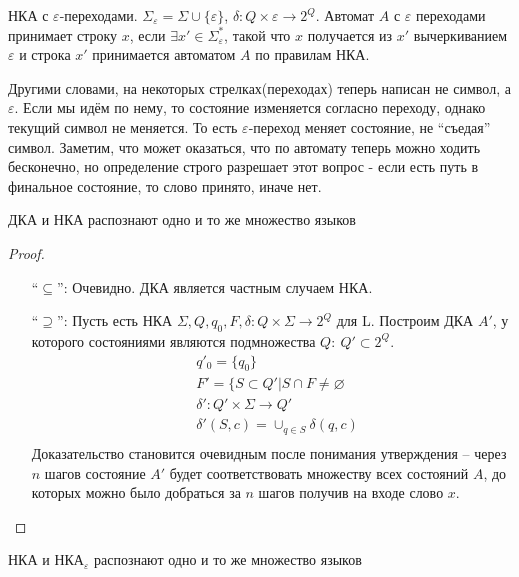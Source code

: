 \begin{conj}
    НКА с $\varepsilon$-переходами. $\Sigma_\varepsilon = \Sigma \cup \{\varepsilon\}$, $\delta : Q \times \varepsilon \to 2^Q$. 
    Автомат $A$ с $\varepsilon$ переходами принимает строку $x$, если $\exists x' \in \Sigma^*_\varepsilon$, такой что $x$ получается из $x'$ вычеркиванием $\varepsilon$ и 
    строка $x'$ принимается автоматом $A$ по правилам НКА.
\end{conj}

Другими словами, на некоторых стрелках(переходах) теперь написан не символ, а $\varepsilon$. Если мы идём по нему, то состояние изменяется согласно переходу, однако текущий символ не меняется. То есть $\varepsilon$-переход меняет состояние, не ``съедая'' символ. 
Заметим, что может оказаться, что по автомату теперь можно ходить бесконечно, но определение строго разрешает этот вопрос - если есть путь в финальное состояние, то слово принято, иначе нет.

\begin{theorem}
    ДКА и НКА распознают одно и то же множество языков
\end{theorem}

\begin{proof} \quad 
    
    \begin{enumerate}
        \item[``$\subseteq$'':] Очевидно. ДКА является частным случаем НКА.
        \item[``$\supseteq$'':] Пусть есть НКА $\Sigma, Q, q_0, F, \delta : Q \times \Sigma \to 2^Q$ для L. Построим ДКА $A'$, у которого состояниями являются подмножества $Q:\ Q' \subset 2^Q$.
        \begin{align*}
            &q'_0 = \{q_0\}\\
            &F' = \{S \subset Q' | S \cap F \neq \varnothing\\
            &\delta' : Q' \times \Sigma \to Q'\\
            &\delta'(S, c) = \cup_{q \in S} \delta(q, c)\\
        \end{align*}
        Доказательство становится очевидным после понимания утверждения -- через $n$ шагов состояние $A'$ будет соответствовать множеству всех состояний $A$, до которых можно было добраться за $n$ шагов получив на входе слово $x$. 
    \end{enumerate}
\end{proof}

\begin{theorem}
    НКА и $\text{НКА}_\varepsilon$ распознают одно и то же множество языков
\end{theorem}

